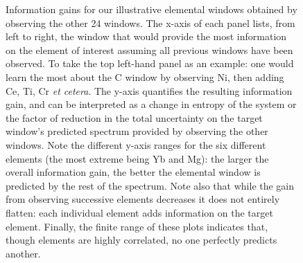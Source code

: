 \documentclass[a4paper,fleqn,usenatbib]{mnras}
\begin{document}
\begin{figure}
    \caption{Information gains for our illustrative elemental windows obtained by observing the other 24 windows. The x-axis of each panel lists, from left to right, the window that would provide the most information on the element of interest assuming all previous windows have been observed. To take the top left-hand panel as an example: one would learn the most about the C window by observing Ni, then adding Ce, Ti, Cr {\it et cetera}. The y-axis quantifies the resulting information gain, and can be interpreted as a change in entropy of the system or the factor of reduction in the total uncertainty on the target window's predicted spectrum provided by observing the other windows. Note the different y-axis ranges for the six different elements (the most extreme being Yb and Mg): the larger the overall information gain, the better the elemental window is predicted by the rest of the spectrum. Note also that while the gain from observing successive elements decreases it does not entirely flatten: each individual element adds information on the target element. Finally, the finite range of these plots indicates that, though elements are highly correlated, no one perfectly predicts another.}
    \label{fig:single_element_information}
\end{figure}
\end{document}
